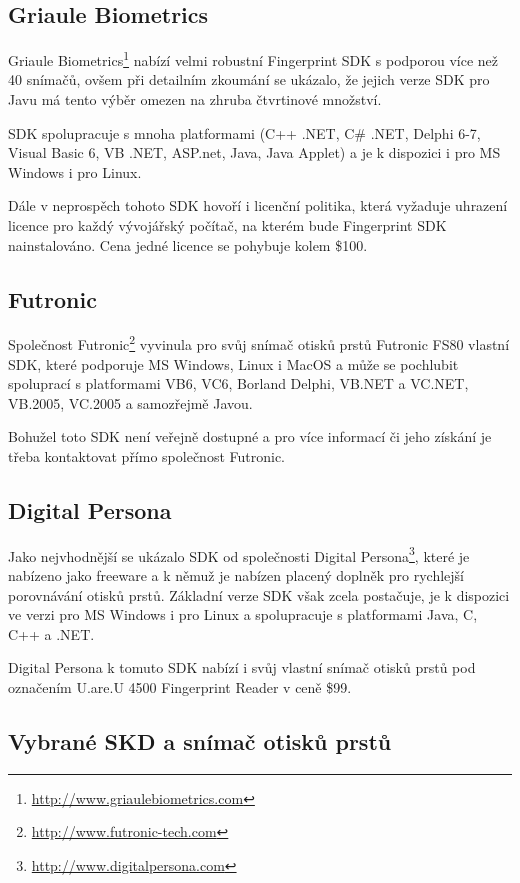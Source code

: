 \documentclass[11pt,twoside,a4paper]{book}
\begin{document}
\subsection{Griaule Biometrics}

Griaule Biometrics\footnote{\url{http://www.griaulebiometrics.com}} nabízí velmi robustní Fingerprint SDK s podporou více než 40 snímačů, ovšem při detailním zkoumání se ukázalo, že jejich verze SDK pro Javu má tento výběr omezen na zhruba čtvrtinové množství. 

SDK spolupracuje s mnoha platformami (C++ .NET, C\# .NET, Delphi 6-7, Visual Basic 6, VB .NET, ASP.net, Java, Java Applet) a je k dispozici i pro MS Windows i pro Linux. 

Dále v neprospěch tohoto SDK hovoří i licenční politika, která vyžaduje uhrazení licence pro každý vývojářský počítač, na kterém bude Fingerprint SDK nainstalováno. Cena jedné licence se pohybuje kolem \$100.

\subsection{Futronic}

Společnost Futronic\footnote{\url{http://www.futronic-tech.com}} vyvinula pro svůj snímač otisků prstů Futronic FS80 vlastní SDK, které podporuje MS Windows, Linux i MacOS a může se pochlubit spoluprací s platformami VB6, VC6, Borland Delphi, VB.NET a VC.NET, VB.2005, VC.2005 a samozřejmě Javou.

Bohužel toto SDK není veřejně dostupné a pro více informací či jeho získání je třeba kontaktovat přímo společnost Futronic. 

\subsection{Digital Persona}

Jako nejvhodnější se ukázalo SDK od společnosti Digital Persona\footnote{\url{http://www.digitalpersona.com}}, které je nabízeno jako freeware a k němuž je nabízen placený doplněk pro rychlejší porovnávání otisků prstů. Základní verze SDK však zcela postačuje, je k dispozici ve verzi pro MS Windows i pro Linux a spolupracuje s platformami Java, C, C++ a .NET.

Digital Persona k tomuto SDK nabízí i svůj vlastní snímač otisků prstů pod označením U.are.U 4500 Fingerprint Reader v ceně \$99.

\subsection{Vybrané SKD a snímač otisků prstů}
\end{document}
